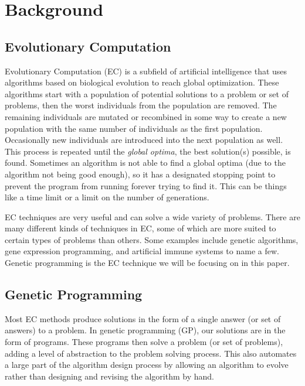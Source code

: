 \documentclass{sig-alternate}
\begin{document}
\section{Background}
\label{sec:background}

\subsection{Evolutionary Computation}
\label{sec:evocomp}
Evolutionary Computation (EC) is a subfield of artificial intelligence that uses algorithms based on biological evolution to reach global optimization. These algorithms start with a population of potential solutions to a problem or set of problems, then the worst individuals from the population are removed. The remaining individuals are mutated or recombined in some way to create a new population with the same number of individuals as the first population. Occasionally new individuals are introduced into the next population as well. This process is repeated until the \textit{global optima}, the best solution(s) possible, is found. Sometimes an algorithm is not able to find a global optima (due to the algorithm not being good enough), so it has a designated stopping point to prevent the program from running forever trying to find it. This can be things like a time limit or a limit on the number of generations.

EC techniques are very useful and can solve a wide variety of problems. There are many different kinds of techniques in EC, some of which are more suited to certain types of problems than others. Some examples include genetic algorithms, gene expression programming, and artificial immune systems to name a few. Genetic programming is the EC technique we will be focusing on in this paper.

\subsection{Genetic Programming}
\label{sec:GP}
Most EC methods produce solutions in the form of a single answer (or set of answers) to a problem. In genetic programming (GP), our solutions are in the form of programs. These programs then solve a problem (or set of problems), adding a level of abstraction to the problem solving process. 
This also automates a large part of the algorithm design process by allowing an algorithm to evolve rather than designing and revising the algorithm by hand. 
\end{document}
